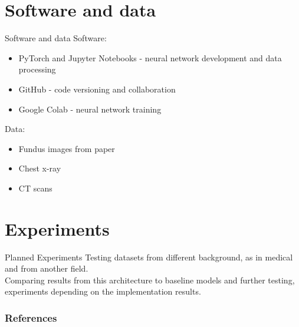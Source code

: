\documentclass [xcolor=svgnames, t] {beamer}
\begin{document}
\section{Software and data}
\begin{frame}{Software and data}
Software:
\begin{itemize}
    \item PyTorch and Jupyter Notebooks - neural network development and data processing
    \item GitHub - code versioning and collaboration
    \item Google Colab - neural network training
\end{itemize}
Data:
\begin{itemize}
    \item Fundus images from paper
    \item Chest x-ray
    \item CT scans
\end{itemize}

\end{frame}

\section{Experiments}
\begin{frame}{Planned Experiments}
   Testing datasets from different background, as in medical and from another field.\\
   Comparing results from this architecture to baseline models and further testing, experiments depending on the implementation results.
\end{frame}

    

\begin{frame} [allowframebreaks]\frametitle{References}
               
        
        
\end{frame}
\end{document}
